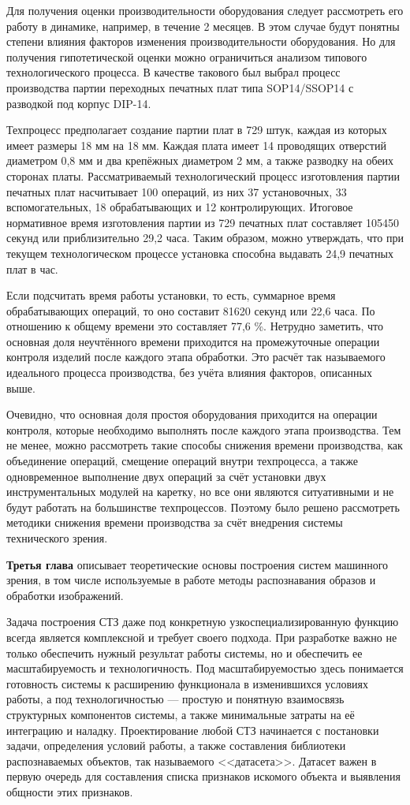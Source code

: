 Для получения оценки производительности оборудования следует рассмотреть его работу в динамике, например, в течение 2 месяцев. В этом случае будут понятны степени влияния факторов изменения производительности оборудования. Но для получения гипотетической оценки можно ограничиться анализом типового технологического процесса. В качестве такового был выбрал процесс производства партии переходных печатных плат типа SOP14/SSOP14 с разводкой под корпус DIP-14.

Техпроцесс предполагает создание партии плат в 729 штук, каждая из которых имеет размеры 18 мм на 18 мм. Каждая плата имеет 14 проводящих отверстий диаметром 0,8 мм и два крепёжных диаметром 2 мм, а также разводку на обеих сторонах платы. Рассматриваемый технологический процесс изготовления партии печатных плат насчитывает 100 операций, из них 37 установочных, 33 вспомогательных, 18 обрабатывающих и 12 контролирующих. Итоговое нормативное время изготовления партии из 729 печатных плат составляет 105450 секунд или приблизительно 29,2 часа. Таким образом, можно утверждать, что при текущем технологическом процессе установка способна выдавать 24,9 печатных плат в час.

Если подсчитать время работы установки, то есть, суммарное время обрабатывающих операций, то оно составит 81620 секунд или 22,6 часа. По отношению к общему времени это составляет 77,6 \%. Нетрудно заметить, что основная доля неучтённого времени приходится на промежуточные операции контроля изделий после каждого этапа обработки. Это расчёт так называемого идеального процесса производства, без учёта влияния факторов, описанных выше.

Очевидно, что основная доля простоя оборудования приходится на операции контроля, которые необходимо выполнять после каждого этапа производства. Тем не менее, можно рассмотреть такие способы снижения времени производства, как объединение операций, смещение операций внутри техпроцесса, а также одновременное выполнение двух операций за счёт установки двух инструментальных модулей на каретку, но все они являются ситуативными и не будут работать на большинстве техпроцессов. Поэтому было решено рассмотреть методики снижения времени производства за счёт внедрения системы технического зрения.

\textbf{Третья глава} описывает теоретические основы построения систем машинного зрения, в том числе используемые в работе методы распознавания образов и обработки изображений.

Задача построения СТЗ даже под конкретную узкоспециализированную функцию всегда является комплексной и требует своего подхода. При разработке важно не только обеспечить нужный результат работы системы, но и обеспечить ее масштабируемость и технологичность. Под масштабируемостью здесь понимается готовность системы к расширению функционала в изменившихся условиях работы, а под технологичностью --- простую и понятную взаимосвязь структурных компонентов системы, а также минимальные затраты на её интеграцию и наладку. Проектирование любой СТЗ начинается с постановки задачи, определения условий работы, а также составления библиотеки распознаваемых объектов, так называемого <<датасета>>. Датасет важен в первую очередь для составления списка признаков искомого объекта и выявления общности этих признаков.

